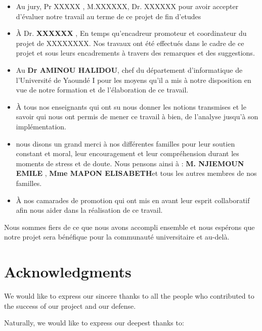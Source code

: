 \documentclass[12pt,a4paper,oneside]{extbook}
\begin{document}
\begin{itemize}
    

\item Au jury, Pr XXXXX , M.XXXXXX, Dr. XXXXXX pour avoir accepter d'évaluer notre 
travail au terme de ce projet de fin d'etudes



\item À Dr. \textbf{ XXXXXX },  En temps qu'encadreur promoteur et coordinateur du projet de XXXXXXXX. Nos travaux ont été effectués dans le cadre de ce projet et sous leurs encadrements à travers des remarques et des suggestions.

\item Au \textbf{Dr AMINOU HALIDOU}, chef du département d’informatique de l’Université de Yaoundé I pour les moyens qu’il a mis à notre disposition en vue de notre formation et de l’élaboration de ce travail.

\item À tous nos enseignants qui ont su nous donner les notions transmises et le savoir qui nous ont permis de mener ce travail à bien, de l'analyse jusqu'à son implémentation.

\item nous disons un grand merci à nos différentes familles pour leur soutien constant et moral, leur encouragement et leur compréhension durant les moments de stress et de doute. Nous pensons ainsi à : \textbf{ M. NJIEMOUN EMILE }, \textbf{ Mme MAPON ELISABETH}et tous les autres membres de nos familles.

\item À nos camarades de promotion qui ont mis en avant leur esprit collaboratif afin nous aider dans la réalisation de ce travail.

 
\end{itemize}
Nous sommes fiers de ce que nous avons accompli ensemble et nous espérons que notre projet sera bénéfique pour la communauté universitaire et au-delà.





\newpage
{}
 \section*{Acknowledgments}
We would like to express our sincere thanks to all the people who contributed to the success of our project and our defense.

Naturally, we would like to express our deepest thanks to:
\end{document}

